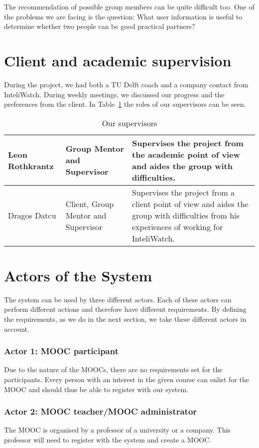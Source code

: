 The recommendation of possible group members can be quite difficult too.
One of the problems we are facing is the question: What user information is useful to determine whether two people can be good practical partners?

\section{Client and academic supervision}
During the project, we had both a TU Delft coach and a company contact from InteliWatch.
During weekly meetings, we discussed our progress and the preferences from the client.
In Table~\ref{supervision} the roles of our supervisors can be seen.

\begin{table}[H]
\caption{Our supervisors}
\begin{tabular}{ | p{3cm} | p{5cm} | p{6cm} | }
 \hline
Leon Rothkrantz & Group Mentor and Supervisor & Supervises the project from the academic point of view and aides the group with difficulties.\\ \hline
Dragos Datcu &  Client, Group Mentor and Supervisor & Supervises the project from a client point of view and aides the group with difficulties from his experiences of working for InteliWatch.\\
\hline
\end{tabular}
\label{supervision}
\end{table}

\section{Actors of the System}
The system can be used by three different actors.
Each of these actors can perform different actions and therefore have different requirements.
By defining the requirements, as we do in the next section, we take these different actors in account.

\subsubsection{Actor 1: MOOC participant}
Due to the nature of the MOOCs, there are no requirements set for the participants.
Every person with an interest in the given course can enlist for the MOOC and should thus be able to register with our system.
\subsubsection{Actor 2: MOOC teacher/MOOC administrator} 
The MOOC is organised by a professor of a university or a company.
This professor will need to register with the system and create a MOOC.

